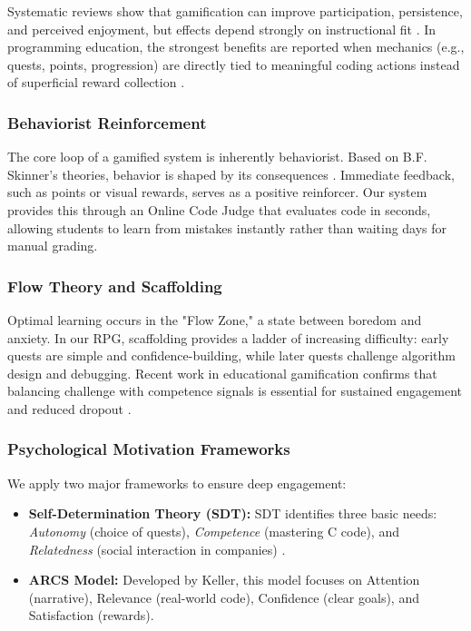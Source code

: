 \documentclass[a4paper, UKenglish, cleveref, autoref, thm-restate]{oasics-v2021}
\begin{document}
Systematic reviews show that gamification can improve participation, persistence, and perceived enjoyment, but effects depend strongly on instructional fit \cite{hamari2014does,dicheva2015gamification}. In programming education, the strongest benefits are reported when mechanics (e.g., quests, points, progression) are directly tied to meaningful coding actions instead of superficial reward collection \cite{zhan2022meta}.

\subsubsection{Behaviorist Reinforcement}
The core loop of a gamified system is inherently behaviorist. Based on B.F. Skinner’s theories, behavior is shaped by its consequences \cite{skinner1958teaching}. Immediate feedback, such as points or visual rewards, serves as a positive reinforcer. Our system provides this through an Online Code Judge that evaluates code in seconds, allowing students to learn from mistakes instantly rather than waiting days for manual grading.

\subsubsection{Flow Theory and Scaffolding}
Optimal learning occurs in the "Flow Zone," a state between boredom and anxiety. In our RPG, scaffolding provides a ladder of increasing difficulty: early quests are simple and confidence-building, while later quests challenge algorithm design and debugging. Recent work in educational gamification confirms that balancing challenge with competence signals is essential for sustained engagement and reduced dropout \cite{li2023flow,challco2023gamiflow}.

\subsubsection{Psychological Motivation Frameworks}
We apply two major frameworks to ensure deep engagement:
\begin{itemize}
    \item \textbf{Self-Determination Theory (SDT):} SDT identifies three basic needs: \textit{Autonomy} (choice of quests), \textit{Competence} (mastering C code), and \textit{Relatedness} (social interaction in companies) \cite{ryan2000self}.
    \item \textbf{ARCS Model:} Developed by Keller, this model focuses on Attention (narrative), Relevance (real-world code), Confidence (clear goals), and Satisfaction (rewards).
\end{itemize}
\end{document}
